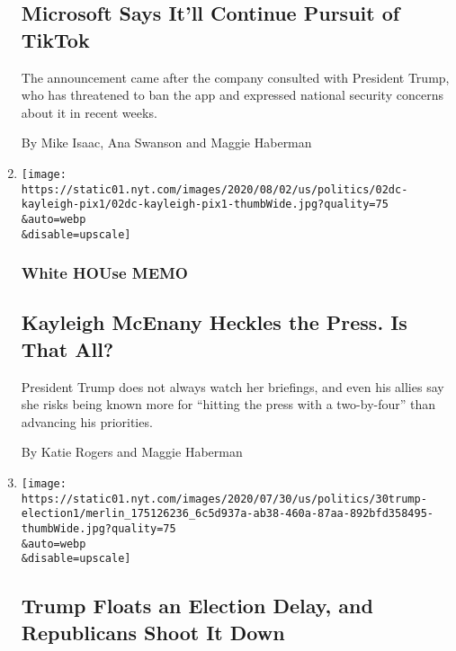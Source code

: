 \begin{enumerate}
  \hypertarget{microsoft-says-itll-continue-pursuit-of-tiktok}{%
  \subsection{Microsoft Says It'll Continue Pursuit of
  TikTok}\label{microsoft-says-itll-continue-pursuit-of-tiktok}}

  The announcement came after the company consulted with President
  Trump, who has threatened to ban the app and expressed national
  security concerns about it in recent weeks.

  By Mike Isaac, Ana Swanson and Maggie Haberman
\item
  \href{/2020/08/02/us/politics/kayleigh-mcenany.html}{}

  \texttt{[image: https://static01.nyt.com/images/2020/08/02/us/politics/02dc-kayleigh-pix1/02dc-kayleigh-pix1-thumbWide.jpg?quality=75\\\&auto=webp\\\&disable=upscale]}

  \hypertarget{white-house-memo}{%
  \subsubsection{White HOUse MEMO}\label{white-house-memo}}

  \hypertarget{kayleigh-mcenany-heckles-the-press-is-that-all}{%
  \subsection{Kayleigh McEnany Heckles the Press. Is That
  All?}\label{kayleigh-mcenany-heckles-the-press-is-that-all}}

  President Trump does not always watch her briefings, and even his
  allies say she risks being known more for ``hitting the press with a
  two-by-four'' than advancing his priorities.

  By Katie Rogers and Maggie Haberman
\item
  \href{/2020/07/30/us/politics/trump-delay-2020-election.html}{}

  \texttt{[image: https://static01.nyt.com/images/2020/07/30/us/politics/30trump-election1/merlin\_175126236\_6c5d937a-ab38-460a-87aa-892bfd358495-thumbWide.jpg?quality=75\\\&auto=webp\\\&disable=upscale]}

  \hypertarget{trump-floats-an-election-delay-and-republicans-shoot-it-down}{%
  \subsection{Trump Floats an Election Delay, and Republicans Shoot It
  Down}\label{trump-floats-an-election-delay-and-republicans-shoot-it-down}}


\end{enumerate}

